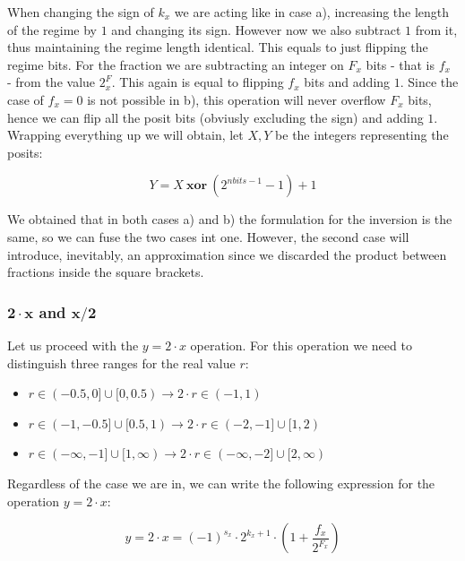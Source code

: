 When changing the sign of $k_x$ we are acting like in case a), increasing the length of the regime by $1$ and changing its sign. However now we also subtract $1$ from it, thus maintaining the regime length identical. This equals to just flipping the regime bits.  For the fraction we are subtracting an integer on $F_x$ bits - that is $f_x$ - from the value $2^F_x$. This again is equal to flipping $f_x$ bits and adding $1$. Since the case of $f_x = 0$ is not possible in b), this operation will never overflow $F_x$ bits, hence we can flip all the posit bits (obviusly excluding the sign) and adding $1$. Wrapping everything up we will obtain, let $X,Y$ be the integers representing the posits:

\begin{equation}
    Y = X\ \mathbf{xor}\ (2^{nbits - 1} - 1) + 1
\end{equation}


We obtained that in both cases a) and b) the formulation for the inversion is the same, so we can fuse the two cases int one. However, the second case will introduce, inevitably, an approximation since we discarded the product between fractions inside the square brackets.


\subsubsection{$\mathbf{2\cdot x}$ and $\mathbf{x/2}$}

Let us proceed with the $y = 2\cdot x$ operation. For this operation we need to distinguish three ranges for the real value $r$:


\begin{itemize}
    \item[a)] $r \in (-0.5,0] \cup [0,0.5) \xrightarrow{} 2\cdot r \in (-1,1)$
    \item[b)] $r \in (-1,-0.5] \cup [0.5,1) \xrightarrow{} 2\cdot r \in (-2,-1] \cup [1,2) $
    \item[c)] $r \in (-\infty, -1] \cup [1, \infty)  \xrightarrow{} 2\cdot r \in (-\infty, -2] \cup [2, \infty)$
\end{itemize}

Regardless of the case we are in, we can write the following expression for the operation $y = 2 \cdot x$:

\begin{equation}
    y = 2 \cdot x = (-1)^{s_x} \cdot 2^{k_x + 1} \cdot \left(1 + \frac{f_x}{2^{F_x}} \right) 
\end{equation}

